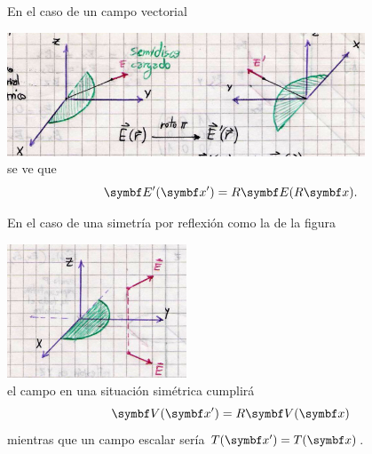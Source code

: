 \documentclass[10pt,oneside]{CBFT_book}
\begin{document}
En el caso de un campo vectorial 

\includegraphics[width=0.8\textwidth]{images/fig_ft1_rotacion_vectorial.jpg}\\
se ve que 
\[
	\vb{E}'(\vb{x}') = R\vb{E}( R\vb{x}).
\]

En el caso de una simetría por reflexión como la de la figura 

\includegraphics[width=0.4\textwidth]{images/fig_ft1_reflexion_vectorial.jpg}\\
el campo en una situación simétrica cumplirá 
\[
	\vb{V}(\vb{x}') = R \vb{V}(\vb{x})
\]
mientras que un campo escalar sería $T(\vb{x}')=T(\vb{x})$.
\end{document}
